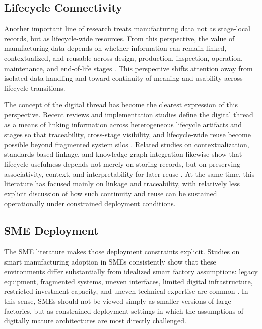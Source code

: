 \documentclass[systems,article,accept,pdftex,moreauthors]{Definitions/mdpi}
\begin{document}
\subsection{Lifecycle Connectivity}
\label{sec:lifecycle_connectivity}

Another important line of research treats manufacturing data not as stage-local records, but as lifecycle-wide resources. From this perspective, the value of manufacturing data depends on whether information can remain linked, contextualized, and reusable across design, production, inspection, operation, maintenance, and end-of-life stages \cite{ren2019bigdata, tao2018datadriven, bernstein2018contextualising, hedberg2017lift}. This perspective shifts attention away from isolated data handling and toward continuity of meaning and usability across lifecycle transitions.

The concept of the digital thread has become the clearest expression of this perspective. Recent reviews and implementation studies define the digital thread as a means of linking information across heterogeneous lifecycle artifacts and stages so that traceability, cross-stage visibility, and lifecycle-wide reuse become possible beyond fragmented system silos \cite{abdelaty2024conceptualizing, zhang2024digitalthread, bianchini2024digitalthread, hedberg2020graphs}. Related studies on contextualization, standards-based linkage, and knowledge-graph integration likewise show that lifecycle usefulness depends not merely on storing records, but on preserving associativity, context, and interpretability for later reuse \cite{kwon2020enriching, schmidt2018flow, monnier2022methodology}. At the same time, this literature has focused mainly on linkage and traceability, with relatively less explicit discussion of how such continuity and reuse can be sustained operationally under constrained deployment conditions.

\subsection{SME Deployment}
\label{sec:sme_deployment}

The SME literature makes those deployment constraints explicit. Studies on smart manufacturing adoption in SMEs consistently show that these environments differ substantially from idealized smart factory assumptions: legacy equipment, fragmented systems, uneven interfaces, limited digital infrastructure, restricted investment capacity, and uneven technical expertise are common \cite{mittal2018maturity, mittal2020adoption, ghobakhloo2019adoption, krishnan2024challenges}. In this sense, SMEs should not be viewed simply as smaller versions of large factories, but as constrained deployment settings in which the assumptions of digitally mature architectures are most directly challenged.
\end{document}
